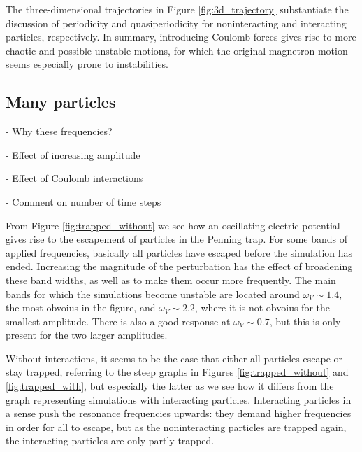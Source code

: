 The three-dimensional trajectories in Figure \ref{fig:3d_trajectory} substantiate the discussion of periodicity and quasiperiodicity for noninteracting and interacting particles, respectively. In summary, introducing Coulomb forces gives rise to more chaotic and possible unstable motions, for which the original magnetron motion seems especially prone to instabilities.





\subsection{Many particles}

\par - Why these frequencies? 
\par - Effect of increasing amplitude
\par - Effect of Coulomb interactions
\par - Comment on number of time steps

From Figure \ref{fig:trapped_without} we see how an oscillating electric potential gives rise to the escapement of particles in the Penning trap. For some bands of applied frequencies, basically all particles have escaped before the simulation has ended. Increasing the magnitude of the perturbation has the effect of broadening these band widths, as well as to make them occur more frequently. The main bands for which the simulations become unstable are located around $\omega_V \sim 1.4$, the most obvoius in the figure, and $\omega_V \sim 2.2$, where it is not obvoius for the smallest amplitude. There is also a good response at $\omega_V\sim 0.7$, but this is only present for the two larger amplitudes.

Without interactions, it seems to be the case that either all particles escape or stay trapped, referring to the steep graphs in Figures \ref{fig:trapped_without} and \ref{fig:trapped_with}, but especially the latter as we see how it differs from the graph representing simulations with interacting particles. Interacting particles in a sense push the resonance frequencies upwards: they demand higher frequencies in order for all to escape, but as the noninteracting particles are trapped again, the interacting particles are only partly trapped. 



